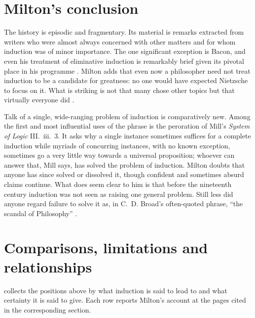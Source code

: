 \section{Milton's conclusion}
\label{sec:p15-w02b-p15-026-conclusion}

The history is episodic and fragmentary. Its material is remarks
extracted from writers who were almost always concerned with other matters
and for whom induction was of minor importance. The one significant
exception is Bacon, and even his treatment of eliminative induction is
remarkably brief given its pivotal place in his programme
\cite[p.~36]{Milton2011InductionBeforeHume}. Milton adds that even now a
philosopher need not treat induction to be a candidate for greatness: no one
would have expected Nietzsche to focus on it. What is striking is not that
many chose other topics but that virtually everyone did
\cite[p.~36]{Milton2011InductionBeforeHume}.

Talk of a single, wide-ranging problem of induction is comparatively
new. Among the first and most influential uses of the phrase is the
peroration of Mill's \emph{System of Logic} III.~iii.~3. It asks why a
single instance sometimes suffices for a complete induction while myriads
of concurring instances, with no known exception, sometimes go a very
little way towards a universal proposition; whoever can answer that, Mill
says, has solved the problem of induction. Milton doubts that anyone has
since solved or dissolved it, though confident and sometimes absurd claims
continue. What does seem clear to him is that before the nineteenth century
induction was not seen as raising one general problem. Still less did anyone
regard failure to solve it as, in C.~D. Broad's often-quoted phrase,
``the scandal of Philosophy''
\cite[pp.~36--37]{Milton2011InductionBeforeHume}.

\section{Comparisons, limitations and relationships}
\label{sec:p15-w02b-p15-026-comparisons}

 collects the positions above by what
induction is said to lead to and what certainty it is said to give. Each row
reports Milton's account at the pages cited in the corresponding section.

